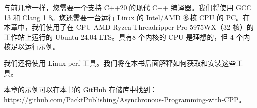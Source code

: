 与前几章一样，您需要一个支持 C++20 的现代 C++ 编译器。我们将使用 GCC 13 和 Clang 1 8。您还需要一台运行 Linux 的 Intel/AMD 多核 CPU 的 PC。在本章中，我们使用了在 CPU AMD Ryzen Threadripper Pro 5975WX（32 核）的工作站上运行的 Ubuntu 24.04 LTS。具有8 个内核的 CPU 是理想的，但 4 个内核足以运行示例。

我们还将使用 Linux perf 工具。我们将在本书后面解释如何获取和安装这些工具。

本章的示例可以在本书的 GitHub 存储库中找到： \url{https://github.com/PacktPublishing/Asynchronous-Programming-with-CPP}。